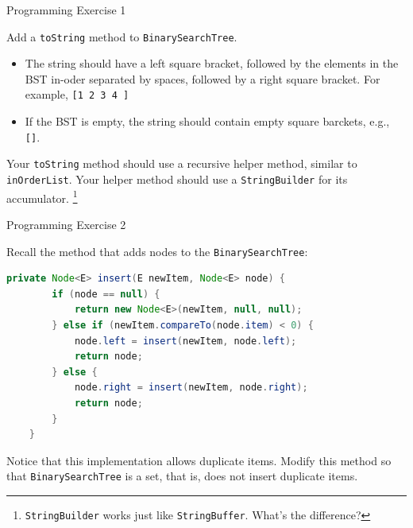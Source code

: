 \documentclass{beamer}
\begin{document}
\begin{frame}[fragile]{Programming Exercise 1}

Add a {\tt toString} method to {\tt BinarySearchTree}.
\begin{itemize}
\item The string should have a left square bracket, followed by the elements in the BST in-oder separated by spaces, followed by a right square bracket.  For example, {\tt [1 2 3 4 ]}
\item If the BST is empty, the string should contain empty square barckets, e.g., {\tt []}.
\end{itemize}
Your {\tt toString} method should use a recursive helper method, similar to {\tt inOrderList}.  Your helper method should use a {\tt StringBuilder} for its accumulator.  \footnote{{\tt StringBuilder} works just like {\tt StringBuffer}.  What's the difference?}

\end{frame}

\begin{frame}[fragile]{Programming Exercise 2}

Recall the method that adds nodes to the {\tt BinarySearchTree}:
\begin{lstlisting}[language=Java]
    private Node<E> insert(E newItem, Node<E> node) {
        if (node == null) {
            return new Node<E>(newItem, null, null);
        } else if (newItem.compareTo(node.item) < 0) {
            node.left = insert(newItem, node.left);
            return node;
        } else {
            node.right = insert(newItem, node.right);
            return node;
        }
    }
\end{lstlisting}
Notice that this implementation allows duplicate items.  Modify this method so that {\tt BinarySearchTree} is a set, that is, does not insert duplicate items.


\end{frame}







\end{document}
